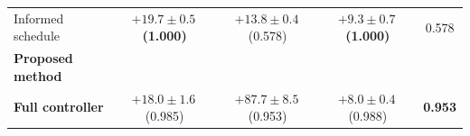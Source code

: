 \begin{tabular}{@{}lcccc@{}}
\cellcolor{tabOracle}Informed schedule
& \cellcolor{tabBest}
  $\boldsymbol{+19.7\pm0.5}$\,{\scriptsize\bfseries(1.000)}
& $+13.8\pm0.4$\,{\scriptsize(0.578)}
& \cellcolor{tabBest}
  $\boldsymbol{+9.3\pm0.7}$\,{\scriptsize\bfseries(1.000)}
& 0.578 \\

\addlinespace[3pt]

\rowcolor{tabGroup}
\textbf{\footnotesize Proposed method}
& & & & \\

\rowcolor{tabFull}
\textbf{Full controller}
& $+18.0\pm1.6$\,{\scriptsize(0.985)}
& $+87.7\pm8.5$\,{\scriptsize(0.953)}
& $+8.0\pm0.4$\,{\scriptsize(0.988)}
& \cellcolor{tabBest}\textbf{0.953} \\

\bottomrule
\end{tabular}

